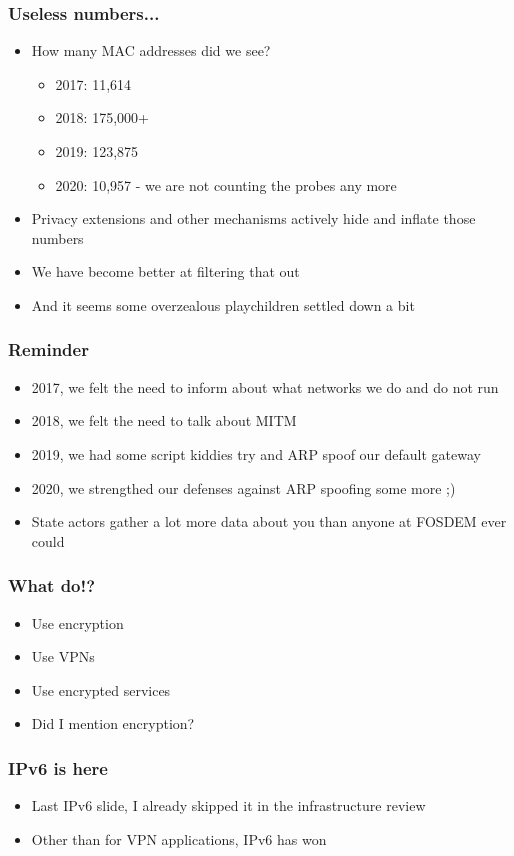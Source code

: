 \documentclass[aspectratio=169]{beamer}
\begin{document}
\begin{frame}
	\frametitle{Useless numbers...}
	\vfill
	\begin{itemize}
		\item How many MAC addresses did we see?
		\begin{itemize}
			\item 2017: 11,614
			\item 2018: 175,000+
			\item 2019: 123,875
			\item 2020: 10,957 - we are not counting the probes any more
		\end{itemize}
		\item Privacy extensions and other mechanisms actively hide and inflate those numbers
		\item We have become better at filtering that out
		\item And it seems some overzealous playchildren settled down a bit
	\end{itemize}
	\vfill
\end{frame}

\begin{frame}
	\frametitle{Reminder}
	\vfill
	\begin{itemize}
		\item 2017, we felt the need to inform about what networks we do and do not run
		\item 2018, we felt the need to talk about MITM
		\item 2019, we had some script kiddies try and ARP spoof our default gateway
		\item 2020, we strengthed our defenses against ARP spoofing some more ;)
		\item State actors gather a lot more data about you than anyone at FOSDEM ever could
	\end{itemize}
	\vfill
\end{frame}

\begin{frame}
	\frametitle{What do!?}
	\vfill
	\begin{itemize}
		\item Use encryption
		\item Use VPNs
		\item Use encrypted services
		\item Did I mention encryption?
	\end{itemize}
	\vfill
\end{frame}

\begin{frame}
	\frametitle{IPv6 is here}
	\vfill
	\begin{itemize}
		\item Last IPv6 slide, I already skipped it in the infrastructure review
		\item Other than for VPN applications, IPv6 has won
	\end{itemize}
	\vfill
\end{frame}
\end{document}
